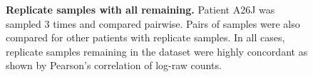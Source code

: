 \begin{figure}[!ht]
\begin{mdframed}
\begin{center}
%
%
    \end{center}
    \caption[Replicate samples with all remaining]{\small \textbf{Replicate samples with all remaining.} Patient A26J was sampled 3 times and compared pairwise. Pairs of samples were also compared for other patients with replicate samples.  In all cases, replicate samples remaining in the dataset were highly concordant as shown by Pearson's correlation of log-raw counts.
}
\label{fig:rep_keepkeep}
\end{mdframed}
\end{figure}


